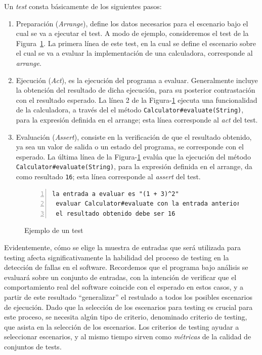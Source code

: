 Un \emph{test} consta b\'asicamente de los siguientes pasos: 
\begin{enumerate}
	\item Preparaci\'on (\emph{Arrange}), define los datos necesarios para el escenario bajo el cual se va a ejecutar el test. A modo de ejemplo, consideremos el test de la Figura~\ref{figures.examples.test.manual}. La primera l\'inea de este test, en la cual se define el escenario sobre el cual se va a evaluar la implementaci\'on de una calculadora, corresponde al \emph{arrange}.
	
	\item Ejecuci\'on (\emph{Act}), es la ejecuci\'on del programa a evaluar. Generalmente incluye la obtenci\'on del resultado de dicha ejecuci\'on, para su posterior contrastaci\'on con el resultado esperado. La l\'inea 2 de la Figura-\ref{figures.examples.test.manual} ejecuta una funcionalidad de la calculadora, a trav\'es del el m\'etodo \texttt{Calculator\#evaluate(String)}, para la expresi\'on definida en el arrange; esta l\'inea corresponde al \emph{act} del test. 
	
	\item Evaluaci\'on (\emph{Assert}), consiste en la verificaci\'on de que el resultado obtenido, ya sea un valor de salida o un estado del programa, se corresponde con el esperado. La \'ultima l\'inea de la Figura-\ref{figures.examples.test.manual} eval\'ua que la ejecuci\'on del m\'etodo \texttt{Calculator\#evaluate(String)}, para la expresi\'on definida en el arrange, da como resultado \texttt{16}; esta l\'inea corresponde al \emph{assert} del test.
\end{enumerate}

\begin{figure}
	\begin{lstlisting}[frame=single, mathescape=true,numbers=left,framexleftmargin=1.5em]
 la entrada a evaluar es "(1 + 3)^2"
 evaluar Calculator#evaluate con la entrada anterior
 el resultado obtenido debe ser 16
	\end{lstlisting}
	\caption{Ejemplo de un test}
	\label{figures.examples.test.manual}
\end{figure}

Evidentemente, c\'omo se elige la muestra de entradas que ser\'a utilizada para testing afecta significativamente la habilidad del proceso de testing en la detecci\'on de fallas en el software. Recordemos que el programa bajo an\'alisis se evaluar\'a sobre un conjunto de entradas, con la intenci\'on de verificar que el comportamiento real del software coincide con el esperado en estos casos, y a partir de este resultado ``generalizar'' el restulado a todos los posibles escenarios de ejecuci\'on. Dado que la selecci\'on de los escenarios para testing es crucial para este proceso, se necesita alg\'un tipo de criterio, denominado criterio de testing, que asista en la selecci\'on de los escenarios. Los criterios de testing ayudar a seleccionar escenarios, y al mismo tiempo sirven como \emph{m\'etricas} de la calidad de conjuntos de tests. 

